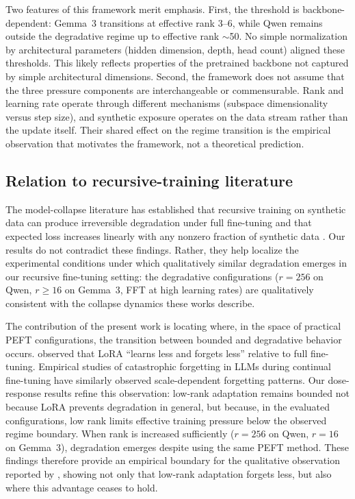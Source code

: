 \documentclass[a4paper,fleqn]{cas-dc}
\begin{document}
Two features of this framework merit emphasis. First, the threshold is
backbone-dependent: Gemma~3 transitions at effective rank 3--6, while Qwen
remains outside the degradative regime up to effective rank ${\sim}$50. No simple normalization by architectural
parameters (hidden dimension, depth, head count) aligned these thresholds. This
likely reflects properties of the pretrained backbone not captured by simple
architectural dimensions. Second, the framework does not assume that the three
pressure components are interchangeable or commensurable. Rank and learning rate
operate through different mechanisms (subspace dimensionality versus step size),
and synthetic exposure operates on the data stream rather than the update
itself. Their shared effect on the regime transition is the empirical
observation that motivates the framework, not a theoretical prediction.

\subsection{Relation to recursive-training literature}\label{sec:disc_literature}

The model-collapse literature has established that recursive training on
synthetic data can produce irreversible degradation under full fine-tuning
\citep{shumailov2024} and that expected loss increases linearly with any
nonzero fraction of synthetic data \citep{dohmatob2025}. Our results do not
contradict these findings. Rather, they help localize the experimental
conditions under which qualitatively similar degradation emerges in our
recursive fine-tuning setting: the degradative configurations ($r=256$ on Qwen,
$r \geq 16$ on Gemma~3, FFT at high learning rates) are qualitatively
consistent with the collapse dynamics these works describe.

The contribution of the present work is locating where, in the space of
practical PEFT configurations, the transition between bounded and degradative
behavior occurs. \citet{biderman2024} observed that LoRA ``learns less and
forgets less'' relative to full fine-tuning. Empirical studies of catastrophic
forgetting in LLMs during continual fine-tuning \citep{luo2023empirical} have
similarly observed scale-dependent forgetting patterns. Our dose-response results
refine
this observation: low-rank adaptation remains bounded not because LoRA prevents
degradation in general, but because, in the evaluated configurations, low rank
limits effective training pressure below the observed regime boundary. When rank
is increased sufficiently ($r=256$ on Qwen, $r=16$ on Gemma~3), degradation
emerges despite using the same PEFT method. These findings therefore
provide an empirical boundary for the qualitative observation reported by
\citet{biderman2024}, showing not only that low-rank adaptation forgets less,
but also where this advantage ceases to hold.
\end{document}
